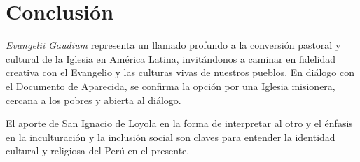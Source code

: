 \documentclass[12pt]{article}
\begin{document}
	\section*{Conclusión}
	
	\textit{Evangelii Gaudium} representa un llamado profundo a la conversión pastoral y cultural de la Iglesia en América Latina, invitándonos a caminar en fidelidad creativa con el Evangelio y las culturas vivas de nuestros pueblos. En diálogo con el Documento de Aparecida, se confirma la opción por una Iglesia misionera, cercana a los pobres y abierta al diálogo.
	
	El aporte de San Ignacio de Loyola en la forma de interpretar al otro y el énfasis en la inculturación y la inclusión social son claves para entender la identidad cultural y religiosa del Perú en el presente.
	
	\printbibliography
	
\end{document}
